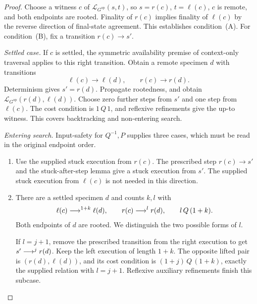 \begin{proof}
Choose a witness $c$ of $\mathcal L_{G^{\mathrm{op}}}(s,t)$, so
$s=r(c)$, $t=\ell(c)$, $c$ is remote, and both endpoints are rooted.
Finality of $r(c)$ implies finality of $\ell(c)$ by the reverse
direction of final-state agreement. This establishes condition~(A).
For condition~(B), fix a transition $r(c)\to s'$.

\emph{Settled case.} If $c$ is settled, the symmetric availability
premise of context-only traversal applies to this right transition.
Obtain a remote specimen $d$ with transitions
\[
 \ell(c)\to\ell(d),\qquad r(c)\to r(d).
\]
Determinism gives $s'=r(d)$. Propagate rootedness, and obtain
$\mathcal L_{G^{\mathrm{op}}}(r(d),\ell(d))$. Choose zero further
steps from $s'$ and one step from $\ell(c)$. The cost condition is
$1\,Q\,1$, and reflexive refinements give the up-to witness. This
covers backtracking and non-entering search.

\emph{Entering search.} Input-safety for $Q^{-1},P$ supplies three
cases, which must be read in the original endpoint order.
\begin{enumerate}[label=\textup{(\Roman*)}]
\item Use the supplied stuck execution from $r(c)$. The prescribed
  step $r(c)\to s'$ and the stuck-after-step lemma give a stuck
  execution from $s'$. The supplied stuck execution from $\ell(c)$
  is not needed in this direction.
\item There are a settled specimen $d$ and counts $k,l$ with
  \[
    \ell(c)\mathrel{\longrightarrow^{1+k}}\ell(d),\qquad r(c)\mathrel{\longrightarrow^{l}}r(d),\qquad
    l\,Q\,(1+k).
  \]
  Both endpoints of $d$ are rooted. We distinguish the two possible
  forms of $l$.

  If $l=j+1$, remove the prescribed transition from the right execution
  to get $s'\mathrel{\longrightarrow^{j}}r(d)$. Keep the left execution of length $1+k$.
  The opposite lifted pair is $(r(d),\ell(d))$, and its cost condition
  is $(1+j)\,Q\,(1+k)$, exactly the supplied relation with $l=j+1$.
  Reflexive auxiliary refinements finish this subcase.


\end{enumerate}
\end{proof}
